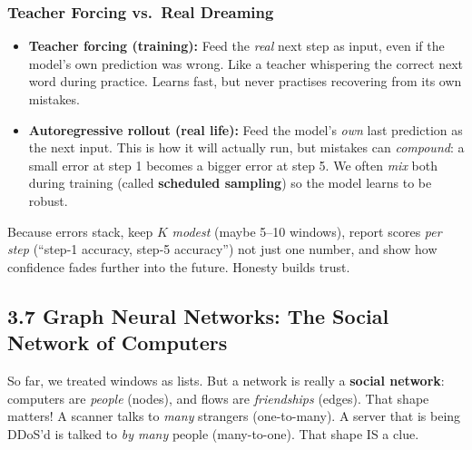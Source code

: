 \documentclass[11pt,a4paper]{article}
\begin{document}
\subsubsection{Teacher Forcing vs.\ Real Dreaming}

\begin{itemize}[leftmargin=1.6em,itemsep=2pt]
  \item \textbf{Teacher forcing (training):} Feed the \emph{real} next step as
        input, even if the model's own prediction was wrong. Like a teacher
whispering the correct next word during practice. Learns fast, but
never practises recovering from its own mistakes.

  \item \textbf{Autoregressive rollout (real life):} Feed the model's \emph{own}
last prediction as the next input. This is how it will actually run,
but mistakes can \emph{compound}: a small error at step 1 becomes a
bigger error at step 5. We often \emph{mix} both during training
(called \textbf{scheduled sampling}) so the model learns to be robust.
\end{itemize}

\begin{warnbox}
Because errors stack, keep $K$ \emph{modest} (maybe 5--10 windows), report
scores \emph{per step} (``step-1 accuracy, step-5 accuracy'') not just one
number, and show how confidence fades further into the future. Honesty builds
trust.
\end{warnbox}

\subsection{3.7 Graph Neural Networks: The Social Network of Computers}
\label{sec:gnn}

So far, we treated windows as lists. But a network is really a \textbf{social
network}: computers are \emph{people} (nodes), and flows are \emph{friendships}
(edges). That shape matters! A scanner talks to \emph{many} strangers
(one-to-many). A server that is being DDoS'd is talked to \emph{by many} people
(many-to-one). That shape IS a clue.

\begin{center}
\end{center}
\end{document}
